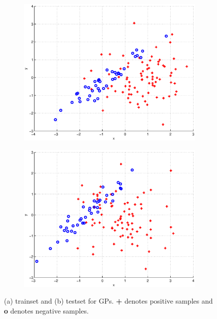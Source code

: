 \documentclass[journal, a4paper]{IEEEtran}
\begin{document}
    
    \begin{figure}[h]      
      \begin{subfigure}{.22\textwidth}
	\centering
	\includegraphics[width=.9\linewidth]{GP_trainset}
	\caption{}
	\label{fig:GP_a}
      \end{subfigure}
      \begin{subfigure}{.22\textwidth}
	\centering
	\includegraphics[width=.9\linewidth]{GP_testset}
	\caption{}
	\label{fig:GP_b}
      \end{subfigure}    
    
      \caption{(a) trainset and (b) testset for GPs. \textbf{+} denotes positive samples and \textbf{o} denotes negative samples.}
      \label{fig:GP_data}      
    \end{figure}
\end{document}
